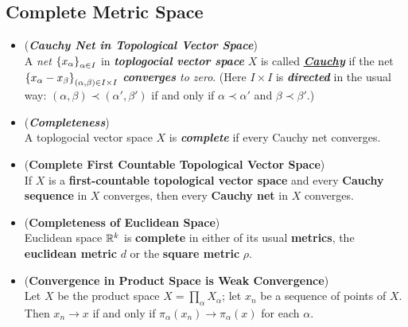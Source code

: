 \documentclass[11pt]{article}
\begin{document}
\subsection{Complete Metric Space}
\begin{itemize}
\item \begin{definition} (\emph{\textbf{Cauchy Net in Topological Vector Space}})\\
A \emph{net}  $\left\{x_\alpha\right\}_{\alpha \in I}$ in \emph{\textbf{toplogocial vector space}} $X$ is called \underline{\emph{\textbf{Cauchy}}} if the net $\left\{x_{\alpha} - x_{\beta}\right\}_{(\alpha, \beta) \in I \times I}$
\emph{\textbf{converges} to zero}. (Here $I \times I$ is \emph{\textbf{directed}} in the usual way: $(\alpha, \beta) \prec (\alpha', \beta')$ if and only if $\alpha \prec \alpha'$ and $\beta \prec \beta'$.) 
\end{definition}

\item \begin{definition} (\emph{\textbf{Completeness}})\\
A toplogocial vector space $X$ is \emph{\textbf{complete}} if every Cauchy net converges.
\end{definition}

\item \begin{proposition} (\textbf{Complete First Countable Topological Vector Space})\\
If $X$ is a \textbf{first-countable topological vector space} and every \textbf{Cauchy sequence} in $X$ converges, then every \textbf{Cauchy net} in $X$ converges.
\end{proposition}

\item \begin{proposition} (\textbf{Completeness of Euclidean Space}) \citep{munkres2000topology} \\
Euclidean space ${\mathbb R}^k$ is \textbf{complete} in either of its usual \textbf{metrics}, the \textbf{euclidean metric} $d$ or the \textbf{square metric} $\rho$.
\end{proposition}

\item \begin{lemma} (\textbf{Convergence in Product Space is Weak Convergence}) \citep{munkres2000topology} \\
Let $X$ be the product space $X = \prod_{\alpha}X_{\alpha}$; let $x_n$ be a sequence of points of $X$. Then $x_n \rightarrow x$ if and only if $\pi_{\alpha}(x_n) \rightarrow  \pi_{\alpha}(x)$ for each $\alpha$.
\end{lemma}


\end{itemize}
\end{document}
